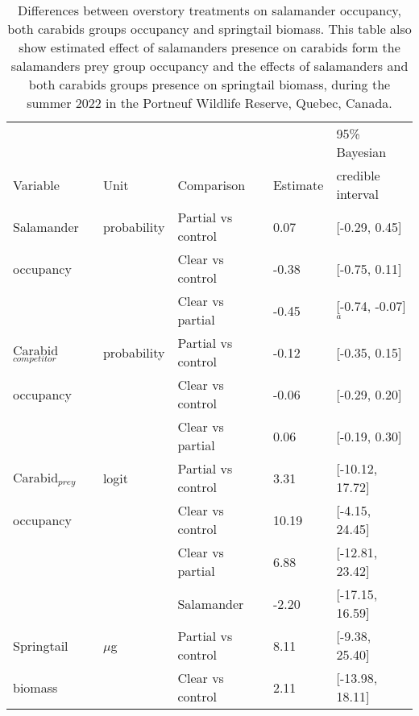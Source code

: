 \vspace{10pt}

\begin{table}[ht]
  \centering
  \caption[Differences between overstory treatments on the forest soil fauna.]
  {Differences between overstory treatments on salamander occupancy, both carabids groups occupancy and springtail biomass. 
  This table also show estimated effect of salamanders presence on carabids form the salamanders prey group occupancy 
  and the effects of salamanders and both carabids groups presence on springtail biomass, during the summer 2022 in the Portneuf Wildlife Reserve, Quebec, Canada.}
  \label{tab:overstorysp}
  \begin{tabular}{lllll} 
      \hline
      &&&&95\% Bayesian \\
      Variable&Unit& Comparison & Estimate &  credible interval \\ [0.5ex] 
      \hline     
      Salamander           &probability& Partial vs control & \hspace{1mm}0.07 & [-0.29, 0.45] \\ 
      occupancy       && Clear vs control  & -0.38 & [-0.75, 0.11] \\ 
                          && Clear vs partial  & -0.45 & [-0.74, -0.07]$^{a}$ \\       
      Carabid$_{competitor}$ &probability& Partial vs control & -0.12 & [-0.35, 0.15] \\
      occupancy       && Clear vs control  & -0.06 & [-0.29, 0.20] \\ 
                          && Clear vs partial  & \hspace{1mm}0.06 & [-0.19, 0.30] \\ 
      Carabid$_{prey}$    &logit& Partial vs control & \hspace{1mm}3.31 & [-10.12, 17.72] \\
      occupancy             && Clear vs control  & \hspace{1mm}10.19 & [-4.15, 24.45] \\ 
                          && Clear vs partial  & \hspace{1mm}6.88 & [-12.81, 23.42] \\  
                          && Salamander        & -2.20 & [-17.15, 16.59] \\  
      Springtail          &$\mu$g& Partial vs control & \hspace{1mm}8.11 & [-9.38, 25.40] \\
      biomass             && Clear vs control  & \hspace{1mm}2.11 & [-13.98, 18.11] \\ 

\end{tabular}
\end{table}
